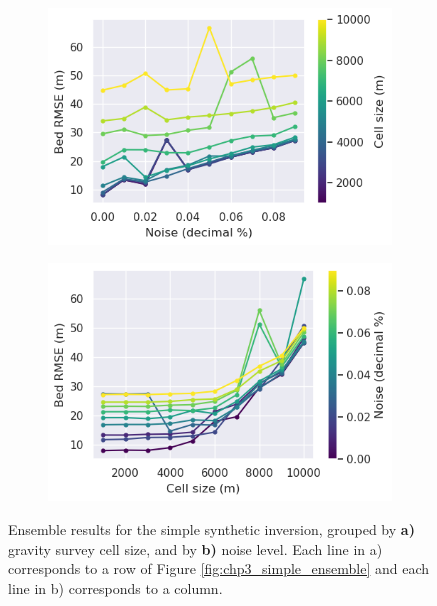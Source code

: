 \begin{figure}[!ht]
  \centering
    \begin{subfigure}[t]{.48\textwidth}
        \centering
        \includegraphics[width=\textwidth]{figures/chp3/chp3_simple_ensemble_noise_lines.png}
        \caption{}
    \end{subfigure}
    \begin{subfigure}[t]{.48\textwidth}
        \centering
        \includegraphics[width=\textwidth]{figures/chp3/chp3_simple_ensemble_cellsize_lines.png}
        \caption{}
    \end{subfigure}
  \caption[Grouped synthetic inversion ensemble]{Ensemble results for the simple synthetic inversion, grouped by \textbf{a)} gravity survey cell size, and by \textbf{b)} noise level. Each line in a) corresponds to a row of Figure \ref{fig:chp3_simple_ensemble} and each line in b) corresponds to a column.}
    \label{fig:chp3_simple_ensemble_lines}
\end{figure}

